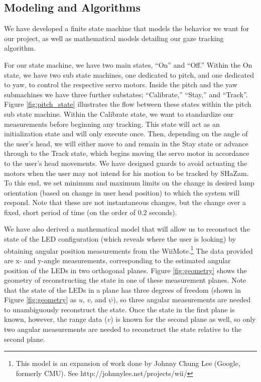 \documentclass[conference, twocolumn]{IEEEtran}
\begin{document}
\subsection{Modeling and Algorithms}
We have developed a finite state machine that models the behavior we want for our project, as well as mathematical models detailing our gaze tracking algorithm.
 
For our state machine, we have two main states, ``On'' and ``Off.'' Within the On state, we have two sub state machines, one dedicated to pitch, and one dedicated to yaw, to control the respective servo motors. Inside the pitch and the yaw submachines we have three further substates; ``Calibrate,'' ``Stay,'' and ``Track''. Figure \ref{fig:pitch_state} illustrates the flow between these states within the pitch sub state machine. Within the Calibrate state, we want to standardize our measurements before beginning any tracking. This state will act as an initialization state and will only execute once. Then, depending on the angle of the user's head, we will either move to and remain in the Stay state or advance through to the Track state, which begins moving the servo motor in accordance to the user's head movements. We have designed guards to avoid actuating the motors when the user may not intend for his motion to be tracked by SHaZam. To this end, we set minimum and maximum limits on the change in desired lamp orientation (based on change in user head position) to which the system will respond. Note that these are not instantaneous changes, but the change over a fixed, short period of time (on the order of 0.2 seconds).

We have also derived a mathematical model that will allow us to reconstuct the state of the LED configuration (which reveals where the user is looking) by obtaining angular position measurements from the WiiMote.\footnote{This model is an expansion of work done by Johnny Chung Lee (Google, formerly CMU). See http://johnnylee.net/projects/wii/} The data provided are x- and y-angle measurements, corresponding to the estimated angular position of the LEDs in two orthogonal planes. Figure \ref{fig:geometry} shows the geometry of reconstructing the state in one of these measurement planes. Note that the state of the LEDs in a plane has three degrees of freedom (shown in Figure \ref{fig:geometry} as $u$, $v$, and $\psi$), so three angular measurements are needed to unambiguously reconstruct the state. Once the state in the first plane is known, however, the range data ($v$) is known for the second plane as well, so only two angular measurements are needed to reconstruct the state relative to the second plane. 
\end{document}
